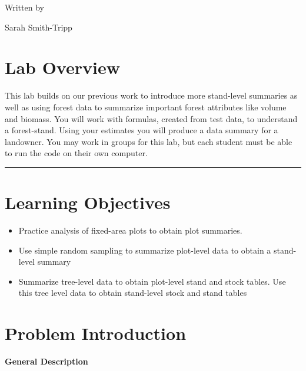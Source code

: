 \documentclass[
  letterpaper,
]{book}
\begin{document}
Written by

Sarah Smith-Tripp

\hypertarget{lab-overview-3}{%
\section*{Lab Overview}\label{lab-overview-3}}


This lab builds on our previous work to introduce more stand-level
summaries as well as using forest data to summarize important forest
attributes like volume and biomass. You will work with formulas, created
from test data, to understand a forest-stand. Using your estimates you
will produce a data summary for a landowner. You may work in groups for
this lab, but each student must be able to run the code on their own
computer.

\begin{center}\rule{0.5\linewidth}{0.5pt}\end{center}

\hypertarget{learning-objectives-3}{%
\section*{Learning Objectives}\label{learning-objectives-3}}


\begin{itemize}
\item
  Practice analysis of fixed-area plots to obtain plot summaries.
\item
  Use simple random sampling to summarize plot-level data to obtain a
  stand-level summary
\item
  Summarize tree-level data to obtain plot-level stand and stock tables.
  Use this tree level data to obtain stand-level stock and stand tables
\end{itemize}

\hypertarget{problem-introduction}{%
\section*{Problem Introduction}\label{problem-introduction}}


\textbf{General Description}
\end{document}
